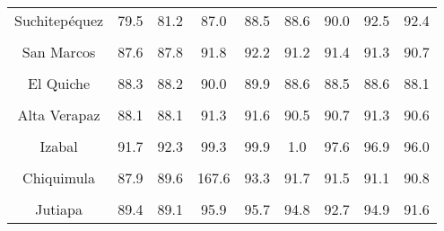 \begin{tabular}[t]{ccccccccc}
Suchitepéquez & 79.5 & 81.2 & 87.0 & 88.5 & 88.6 & 90.0 & 92.5 & 92.4\\
\cellcolor[HTML]{B6B3FF}{Retalhuleu} & \cellcolor[HTML]{B6B3FF}{88.3} & \cellcolor[HTML]{B6B3FF}{86.5} & \cellcolor[HTML]{B6B3FF}{95.1} & \cellcolor[HTML]{B6B3FF}{94.4} & \cellcolor[HTML]{B6B3FF}{93.8} & \cellcolor[HTML]{B6B3FF}{91.6} & \cellcolor[HTML]{B6B3FF}{93.7} & \cellcolor[HTML]{B6B3FF}{91.3}\\
San Marcos & 87.6 & 87.8 & 91.8 & 92.2 & 91.2 & 91.4 & 91.3 & 90.7\\
\cellcolor[HTML]{B6B3FF}{Huehuetenango} & \cellcolor[HTML]{B6B3FF}{86.8} & \cellcolor[HTML]{B6B3FF}{85.7} & \cellcolor[HTML]{B6B3FF}{105.2} & \cellcolor[HTML]{B6B3FF}{86.3} & \cellcolor[HTML]{B6B3FF}{87.2} & \cellcolor[HTML]{B6B3FF}{84.5} & \cellcolor[HTML]{B6B3FF}{86.5} & \cellcolor[HTML]{B6B3FF}{83.1}\\
El Quiche & 88.3 & 88.2 & 90.0 & 89.9 & 88.6 & 88.5 & 88.6 & 88.1\\
\cellcolor[HTML]{B6B3FF}{Baja Verapaz} & \cellcolor[HTML]{B6B3FF}{84.8} & \cellcolor[HTML]{B6B3FF}{85.4} & \cellcolor[HTML]{B6B3FF}{89.0} & \cellcolor[HTML]{B6B3FF}{89.7} & \cellcolor[HTML]{B6B3FF}{85.6} & \cellcolor[HTML]{B6B3FF}{86.6} & \cellcolor[HTML]{B6B3FF}{85.6} & \cellcolor[HTML]{B6B3FF}{86.2}\\
Alta Verapaz & 88.1 & 88.1 & 91.3 & 91.6 & 90.5 & 90.7 & 91.3 & 90.6\\
\cellcolor[HTML]{B6B3FF}{Petén} & \cellcolor[HTML]{B6B3FF}{89.8} & \cellcolor[HTML]{B6B3FF}{89.7} & \cellcolor[HTML]{B6B3FF}{187.9} & \cellcolor[HTML]{B6B3FF}{99.1} & \cellcolor[HTML]{B6B3FF}{95.7} & \cellcolor[HTML]{B6B3FF}{95.2} & \cellcolor[HTML]{B6B3FF}{93.0} & \cellcolor[HTML]{B6B3FF}{91.6}\\
Izabal & 91.7 & 92.3 & 99.3 & 99.9 & 1.0 & 97.6 & 96.9 & 96.0\\
\cellcolor[HTML]{B6B3FF}{Zacapa} & \cellcolor[HTML]{B6B3FF}{86.8} & \cellcolor[HTML]{B6B3FF}{90.0} & \cellcolor[HTML]{B6B3FF}{92.7} & \cellcolor[HTML]{B6B3FF}{96.6} & \cellcolor[HTML]{B6B3FF}{91.6} & \cellcolor[HTML]{B6B3FF}{94.0} & \cellcolor[HTML]{B6B3FF}{91.2} & \cellcolor[HTML]{B6B3FF}{93.3}\\
Chiquimula & 87.9 & 89.6 & 167.6 & 93.3 & 91.7 & 91.5 & 91.1 & 90.8\\
\cellcolor[HTML]{B6B3FF}{Jalapa} & \cellcolor[HTML]{B6B3FF}{84.8} & \cellcolor[HTML]{B6B3FF}{85.3} & \cellcolor[HTML]{B6B3FF}{89.5} & \cellcolor[HTML]{B6B3FF}{89.7} & \cellcolor[HTML]{B6B3FF}{88.5} & \cellcolor[HTML]{B6B3FF}{88.7} & \cellcolor[HTML]{B6B3FF}{89.8} & \cellcolor[HTML]{B6B3FF}{88.7}\\
Jutiapa & 89.4 & 89.1 & 95.9 & 95.7 & 94.8 & 92.7 & 94.9 & 91.6\\
\bottomrule
\end{tabular}
